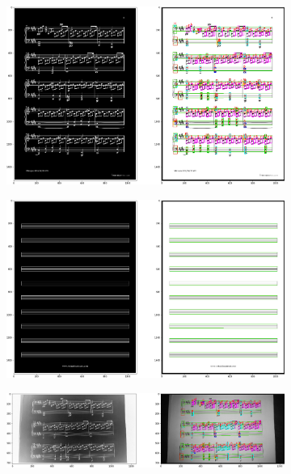 \documentclass[12pt]{article}
\begin{document}
\begin{enumerate}
\begin{figure}[h!]
\begin{subfigure}[b]{0.48\linewidth}
				\end{subfigure}
				\begin{subfigure}[b]{0.48\linewidth}
					\includegraphics[width=\linewidth]{Eazy/Zdj3.png}
				\end{subfigure}
				\begin{subfigure}[b]{0.48\linewidth}
					\includegraphics[width=\linewidth]{Eazy/Zdj4.png}
				\end{subfigure}
				\begin{subfigure}[b]{0.48\linewidth}
					\includegraphics[width=\linewidth]{Eazy/Zdj5.png}
				\end{subfigure}

\end{figure}
\end{enumerate}
\end{document}
